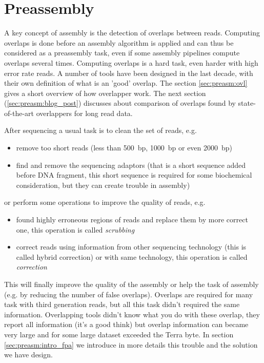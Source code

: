\documentclass[main.tex]{subfiles}
\begin{document}
\chapter{Preassembly}\label{chapter:preassembly}

A key concept of assembly is the detection of overlaps between reads. Computing overlaps is done before an assembly algorithm is applied and can thus be considered as a preassembly task, even if some assembly pipelines compute overlaps several times. Computing overlaps is a hard task, even harder with high error rate reads. A number of tools have been designed in the last decade, with their own definition of what is an 'good' overlap. The section \ref{sec:preasm:ovl} gives a short overview of how overlapper work. The next section (\ref{sec:preasm:blog_post}) discusses about comparison of overlaps found by state-of-the-art overlappers for long read data. 

\bigskip

After sequencing a usual task is to clean the set of reads, e.g.
\begin{itemize}
	\item remove too short reads (less than 500~bp, 1000~bp or even 2000~bp)
	\item find and remove the sequencing adaptors (that is a short sequence added before DNA fragment, this short sequence is required for some biochemical consideration, but they can create trouble in assembly)
\end{itemize}
or perform some operations to improve the quality of reads, e.g.
\begin{itemize}
	\item found highly erroneous regions of reads and replace them by more correct one, this operation is called \emph{scrubbing}
	\item correct reads using information from other sequencing technology (this is called hybrid correction) or with same technology, this operation is called \emph{correction} 
\end{itemize}
This will finally improve the quality of the assembly or help the task of assembly (e.g. by reducing the number of false overlaps). 
Overlaps are required for many task with third generation reads, but all this task didn't required the same information. Overlapping tools didn't know what you do with these overlap, they report all information (it's a good think) but overlap information can became very large and for some large dataset exceeded the Terra byte. In section \ref{sec:preasm:intro_fpa} we introduce in more details this trouble and the solution we have design.
\end{document}
